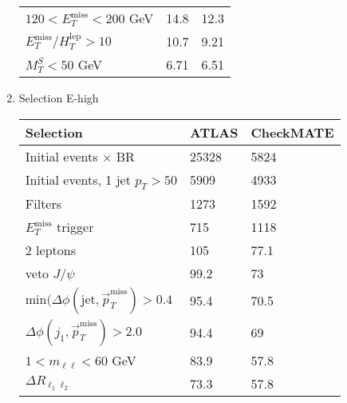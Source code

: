 \documentclass[12pt,fleqn]{article}
\begin{document}
\begin{enumerate}
\begin{table}[h!]
\begin{center}
\begin{tabular}{l|p{3cm}|p{3cm}}
  $120 < E_T^\mathrm{miss} < 200$ GeV                                             &  14.8    &  12.3  \\
  $E_T^\mathrm{miss}/H^{\mathrm{lep}}_T > 10$                                      &  10.7    &  9.21  \\
  $M_T^S < 50$ GeV                                                                &  6.71    &  6.51  \\
  \bottomrule
 \end{tabular} \end{center}
\end{table}
 
\newpage 
 
\item{Selection E-high}

\begin{table}[h!] \begin{center}
 \renewcommand*{\arraystretch}{1.2}
 \begin{tabular}{l|p{3cm}|p{3cm}} \toprule
  Selection                                                                       & ATLAS    & CheckMATE       \\ \midrule
  Initial events $\times$ BR                                                      &  25328    &  5824          \\
  Initial events, 1 jet $p_T > 50$                                                &  5909    &  4933         \\
  Filters                                                                         &  1273    &  1592  \\
  $E_T^\mathrm{miss}$ trigger                                                     &   715    &  1118 \\
  2 leptons                                                                       &   105    &  77.1 \\
  veto $J/\psi$                                                                   &  99.2    &  73 \\ 
  min$(\Delta\phi(\mathrm{jet}, \vec{p}_T^\mathrm{miss})>0.4$                     &  95.4    &  70.5 \\   
  $\Delta\phi(j_1, \vec{p}_T^\mathrm{miss})>2.0$                                  &  94.4    &  69  \\
  $1 < m_{\ell \ell} < 60$ GeV                                                    &  83.9    &  57.8  \\
  $\Delta R_{\ell_1 \ell_2}$                                                      &  73.3    &  57.8\\

\end{tabular}
\end{center}
\end{table}
\end{enumerate}
\end{document}
